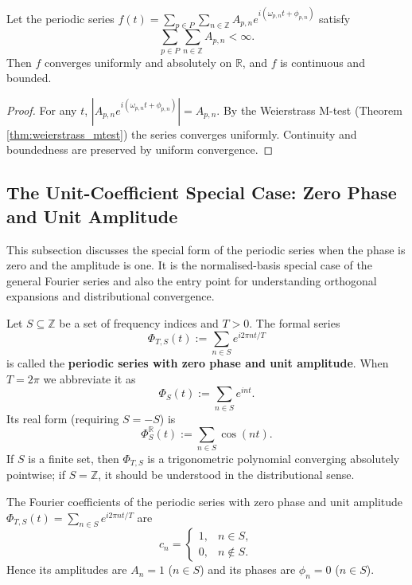 \begin{theorem}\label{thm:periodic_series_convergence}
Let the periodic series $f(t) = \sum_{p \in P} \sum_{n \in \mathbb{Z}} A_{p,n} e^{i(\omega_{p,n} t + \phi_{p,n})}$ satisfy
\[
\sum_{p \in P} \sum_{n \in \mathbb{Z}} A_{p,n} < \infty.
\]
Then $f$ converges uniformly and absolutely on $\mathbb{R}$, and $f$ is continuous and bounded.
\end{theorem}

\begin{proof}
For any $t$, $|A_{p,n} e^{i(\omega_{p,n} t + \phi_{p,n})}| = A_{p,n}$. By the Weierstrass M-test (Theorem \ref{thm:weierstrass_mtest}) the series converges uniformly. Continuity and boundedness are preserved by uniform convergence.
\end{proof}

\subsection{\texorpdfstring{The Unit-Coefficient Special Case: Zero Phase and Unit Amplitude}{The Unit-Coefficient Special Case: Zero Phase and Unit Amplitude}}

This subsection discusses the special form of the periodic series when the phase is zero and the amplitude is one. It is the normalised-basis special case of the general Fourier series and also the entry point for understanding orthogonal expansions and distributional convergence.

\begin{definition}\label{def:unit_phase_zero_amplitude_series}
Let $S \subseteq \mathbb{Z}$ be a set of frequency indices and $T>0$. The formal series
\[
\Phi_{T,S}(t) := \sum_{n \in S} e^{i 2\pi n t/T}
\]
is called the \textbf{periodic series with zero phase and unit amplitude}. When $T=2\pi$ we abbreviate it as
\[
\Phi_S(t) := \sum_{n \in S} e^{i n t}.
\]
Its real form (requiring $S=-S$) is
\[
\Phi_S^{\mathbb{R}}(t) := \sum_{n \in S} \cos(nt).
\]
If $S$ is a finite set, then $\Phi_{T,S}$ is a trigonometric polynomial converging absolutely pointwise; if $S=\mathbb{Z}$, it should be understood in the distributional sense.
\end{definition}

\begin{proposition}\label{prop:unit_phase_zero_coefficients}
The Fourier coefficients of the periodic series with zero phase and unit amplitude $\Phi_{T,S}(t)=\sum_{n\in S}e^{i2\pi n t/T}$ are
\[
c_n =
\begin{cases}
1, & n\in S,\\
0, & n\notin S.
\end{cases}
\]
Hence its amplitudes are $A_n=1$ ($n\in S$) and its phases are $\phi_n=0$ ($n\in S$).
\end{proposition}

